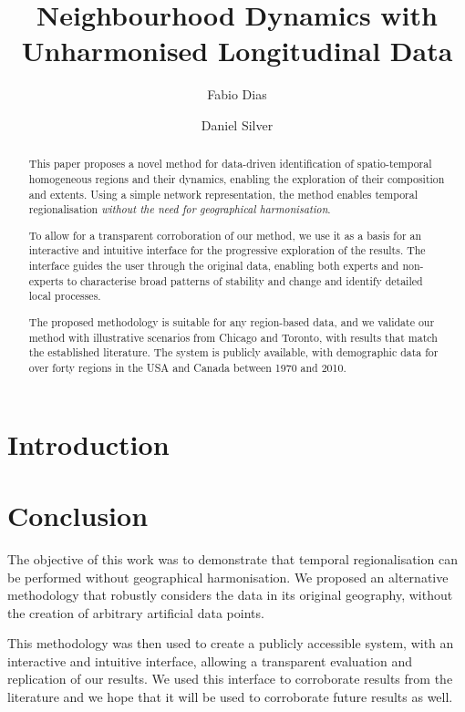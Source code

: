 \documentclass[10pt,letterpaper]{article}
\title{Neighbourhood Dynamics with Unharmonised Longitudinal Data}
\author[1]{Fabio Dias}
\author[2]{Daniel Silver}
\affil[1]{Department of Mechanical \& Industrial Engineering, University of Toronto, Toronto, Canada.}
\affil[2]{Department of Sociology, University of Toronto, Toronto, Canada.}
\date{}
\begin{document}
\maketitle


\begin{abstract}
  This paper proposes a novel method for data-driven
  identification of spatio-temporal homogeneous regions and their dynamics,
  enabling the exploration of their composition and extents.  Using a simple
  network representation, the method enables temporal regionalisation
  \emph{without the need for geographical harmonisation}.
    
  To allow for a transparent corroboration of our method, we use it as a basis
  for an interactive and intuitive interface for the progressive exploration of
  the results. The interface guides the user through the original data, enabling
  both experts and non-experts to characterise broad patterns of stability and
  change and identify detailed local processes.

  
  The proposed methodology is suitable for any region-based data, and we
  validate our method with illustrative scenarios from Chicago and Toronto, with
  results that match the established literature. The system is publicly
  available, with demographic data for over forty regions in the USA and Canada
  between 1970 and 2010.
\end{abstract}

\section{Introduction}\label{sec:introduction}












\section{Conclusion}
The objective of this work was to demonstrate that temporal
regionalisation can be performed without geographical harmonisation. We
proposed an alternative methodology that robustly considers the data in its
original geography, without the creation of arbitrary artificial data points.

This methodology was then used to create a publicly accessible system, with an
interactive and intuitive interface, allowing a transparent evaluation and
replication of our results. We used this interface to corroborate results from
the literature and we hope that it will be used to corroborate future results as
well. 
\end{document}

